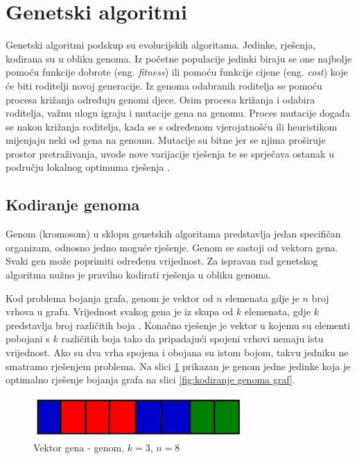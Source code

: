 \documentclass[times, utf8, zavrsni, numeric]{fer}
\begin{document}
\section{Genetski algoritmi}
Genetski algoritmi podskup su evolucijskih algoritama. Jedinke, rješenja, kodirana su u obliku genoma. Iz početne populacije jedinki biraju se one najbolje pomoću funkcije dobrote (eng. \textit{fitness}) ili pomoću funkcije cijene (eng. \textit{cost}) koje će biti roditelji novoj generacije. Iz genoma odabranih roditelja se pomoću procesa križanja određuju genomi djece. Osim procesa križanja i odabira roditelja, važnu ulogu igraju i mutacije gena na genomu. Proces mutacije događa se nakon križanja roditelja, kada se s određenom vjerojatnošću ili heuristikom mijenjaju neki od gena na genomu. Mutacije su bitne jer se njima proširuje prostor pretraživanja, uvode nove varijacije rješenja te se sprječava ostanak u području lokalnog optimuma rješenja \cite{cupic2010prirodom}.

\subsection{Kodiranje genoma}
Genom (kromosom) u sklopu genetskih algoritama predstavlja jedan specifičan organizam, odnosno jedno moguće rješenje. Genom se sastoji od vektora gena. Svaki gen može poprimiti određenu vrijednost. Za ispravan rad genetskog algoritma nužno je pravilno kodirati rješenja u obliku genoma.

Kod problema bojanja grafa, genom je vektor od $n$ elemenata gdje je $n$ broj vrhova u grafu. Vrijednost svakog gena je iz skupa od $k$ elemenata, gdje $k$ predstavlja broj različitih boja \cite{marappan2013new}. Konačno rješenje je vektor u kojemu su elementi pobojani s $k$ različitih boja tako da pripadajući spojeni vrhovi nemaju istu vrijednost. Ako su dva vrha spojena i obojana su istom bojom, takvu jedniku ne smatramo rješenjem problema. Na slici \ref{fig:kodirani genom} prikazan je genom jedne jedinke koja je optimalno rješenje bojanja grafa na slici \ref{fig:kodiranje genoma graf}.

\begin{figure}[htb]
\centering
\includegraphics[width=8cm]{images/genom_encoding.png}
\caption{Vektor gena - genom, $k=3$, $n=8$}
\label{fig:kodirani genom}
\end{figure}
\end{document}
